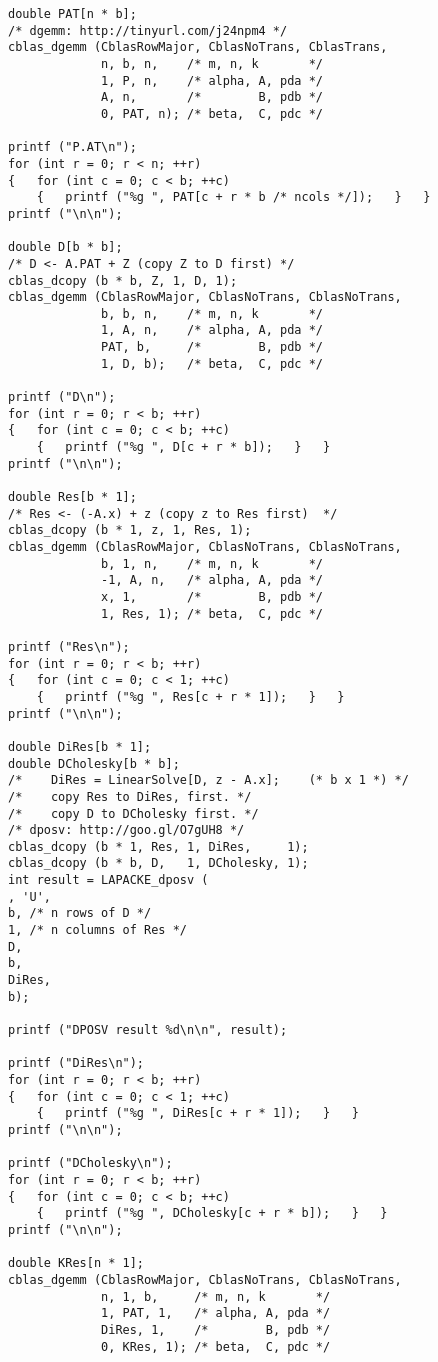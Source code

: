 \documentclass[10pt,oneside,x11names]{article}
\begin{document}
\begin{verbatim}
double PAT[n * b];
/* dgemm: http://tinyurl.com/j24npm4 */
cblas_dgemm (CblasRowMajor, CblasNoTrans, CblasTrans,
             n, b, n,    /* m, n, k       */
             1, P, n,    /* alpha, A, pda */
             A, n,       /*        B, pdb */
             0, PAT, n); /* beta,  C, pdc */

printf ("P.AT\n");
for (int r = 0; r < n; ++r)
{   for (int c = 0; c < b; ++c)
    {   printf ("%g ", PAT[c + r * b /* ncols */]);   }   }
printf ("\n\n");

double D[b * b];
/* D <- A.PAT + Z (copy Z to D first) */
cblas_dcopy (b * b, Z, 1, D, 1);
cblas_dgemm (CblasRowMajor, CblasNoTrans, CblasNoTrans,
             b, b, n,    /* m, n, k       */
             1, A, n,    /* alpha, A, pda */
             PAT, b,     /*        B, pdb */
             1, D, b);   /* beta,  C, pdc */

printf ("D\n");
for (int r = 0; r < b; ++r)
{   for (int c = 0; c < b; ++c)
    {   printf ("%g ", D[c + r * b]);   }   }
printf ("\n\n");

double Res[b * 1];
/* Res <- (-A.x) + z (copy z to Res first)  */
cblas_dcopy (b * 1, z, 1, Res, 1);
cblas_dgemm (CblasRowMajor, CblasNoTrans, CblasNoTrans,
             b, 1, n,    /* m, n, k       */
             -1, A, n,   /* alpha, A, pda */
             x, 1,       /*        B, pdb */
             1, Res, 1); /* beta,  C, pdc */

printf ("Res\n");
for (int r = 0; r < b; ++r)
{   for (int c = 0; c < 1; ++c)
    {   printf ("%g ", Res[c + r * 1]);   }   }
printf ("\n\n");

double DiRes[b * 1];
double DCholesky[b * b];
/*    DiRes = LinearSolve[D, z - A.x];    (* b x 1 *) */
/*    copy Res to DiRes, first. */
/*    copy D to DCholesky first. */
/* dposv: http://goo.gl/O7gUH8 */
cblas_dcopy (b * 1, Res, 1, DiRes,     1);
cblas_dcopy (b * b, D,   1, DCholesky, 1);
int result = LAPACKE_dposv (
, 'U',
b, /* n rows of D */
1, /* n columns of Res */
D,
b,
DiRes,
b);

printf ("DPOSV result %d\n\n", result);

printf ("DiRes\n");
for (int r = 0; r < b; ++r)
{   for (int c = 0; c < 1; ++c)
    {   printf ("%g ", DiRes[c + r * 1]);   }   }
printf ("\n\n");

printf ("DCholesky\n");
for (int r = 0; r < b; ++r)
{   for (int c = 0; c < b; ++c)
    {   printf ("%g ", DCholesky[c + r * b]);   }   }
printf ("\n\n");

double KRes[n * 1];
cblas_dgemm (CblasRowMajor, CblasNoTrans, CblasNoTrans,
             n, 1, b,     /* m, n, k       */
             1, PAT, 1,   /* alpha, A, pda */
             DiRes, 1,    /*        B, pdb */
             0, KRes, 1); /* beta,  C, pdc */


\end{verbatim}
\end{document}

